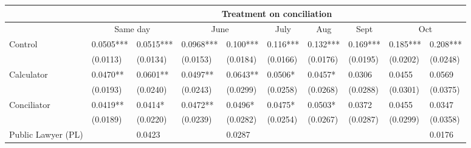 \begin{tabular}{rrrrrrrrrr}
\toprule
      & \multicolumn{9}{c}{Treatment on conciliation} \\
\midrule
      & \multicolumn{2}{c}{Same day} & \multicolumn{2}{c}{June} & \multicolumn{1}{c}{July } & \multicolumn{1}{c}{Aug} & \multicolumn{1}{c}{Sept} & \multicolumn{2}{c}{Oct} \\
\multicolumn{1}{l}{Control} & \multicolumn{1}{l}{0.0505***} & \multicolumn{1}{l}{0.0515***} & \multicolumn{1}{l}{0.0968***} & \multicolumn{1}{l}{0.100***} & \multicolumn{1}{l}{0.116***} & \multicolumn{1}{l}{0.132***} & \multicolumn{1}{l}{0.169***} & \multicolumn{1}{l}{0.185***} & \multicolumn{1}{l}{0.208***} \\
\multicolumn{1}{l}{} & \multicolumn{1}{l}{(0.0113)} & \multicolumn{1}{l}{(0.0134)} & \multicolumn{1}{l}{(0.0153)} & \multicolumn{1}{l}{(0.0184)} & \multicolumn{1}{l}{(0.0166)} & \multicolumn{1}{l}{(0.0176)} & \multicolumn{1}{l}{(0.0195)} & \multicolumn{1}{l}{(0.0202)} & \multicolumn{1}{l}{(0.0248)} \\
\multicolumn{1}{l}{Calculator} & \multicolumn{1}{l}{0.0470**} & \multicolumn{1}{l}{0.0601**} & \multicolumn{1}{l}{0.0497**} & \multicolumn{1}{l}{0.0643**} & \multicolumn{1}{l}{0.0506*} & \multicolumn{1}{l}{0.0457*} & \multicolumn{1}{l}{0.0306} & \multicolumn{1}{l}{0.0455} & \multicolumn{1}{l}{0.0569} \\
\multicolumn{1}{l}{} & \multicolumn{1}{l}{(0.0193)} & \multicolumn{1}{l}{(0.0240)} & \multicolumn{1}{l}{(0.0243)} & \multicolumn{1}{l}{(0.0299)} & \multicolumn{1}{l}{(0.0258)} & \multicolumn{1}{l}{(0.0268)} & \multicolumn{1}{l}{(0.0288)} & \multicolumn{1}{l}{(0.0301)} & \multicolumn{1}{l}{(0.0375)} \\
\multicolumn{1}{l}{Conciliator} & \multicolumn{1}{l}{0.0419**} & \multicolumn{1}{l}{0.0414*} & \multicolumn{1}{l}{0.0472**} & \multicolumn{1}{l}{0.0496*} & \multicolumn{1}{l}{0.0475*} & \multicolumn{1}{l}{0.0503*} & \multicolumn{1}{l}{0.0372} & \multicolumn{1}{l}{0.0455} & \multicolumn{1}{l}{0.0347} \\
\multicolumn{1}{l}{} & \multicolumn{1}{l}{(0.0189)} & \multicolumn{1}{l}{(0.0220)} & \multicolumn{1}{l}{(0.0239)} & \multicolumn{1}{l}{(0.0282)} & \multicolumn{1}{l}{(0.0254)} & \multicolumn{1}{l}{(0.0267)} & \multicolumn{1}{l}{(0.0287)} & \multicolumn{1}{l}{(0.0299)} & \multicolumn{1}{l}{(0.0358)} \\
\multicolumn{1}{l}{Public Lawyer (PL)} & \multicolumn{1}{l}{} & \multicolumn{1}{l}{0.0423} & \multicolumn{1}{l}{} & \multicolumn{1}{l}{0.0287} & \multicolumn{1}{l}{} & \multicolumn{1}{l}{} & \multicolumn{1}{l}{} & \multicolumn{1}{l}{} & \multicolumn{1}{l}{0.0176} \\

\end{tabular}
